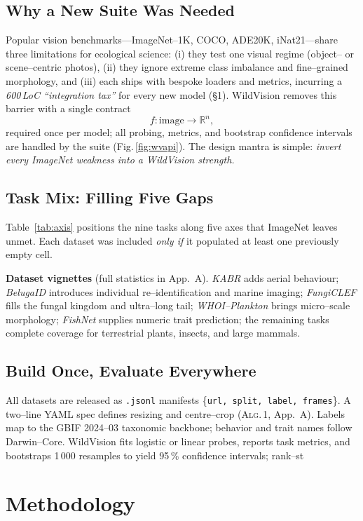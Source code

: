 \documentclass{article}
\begin{document}
\subsection{Why a New Suite Was Needed}
Popular vision benchmarks---ImageNet--1K, COCO, ADE20K, iNat21---share three
limitations for ecological science: (i) they test one visual regime
(object-- or scene--centric photos), (ii) they ignore extreme class
imbalance and fine–grained morphology, and (iii) each ships with bespoke
loaders and metrics, incurring a \emph{600\,LoC “integration tax”} for every
new model (§1).  
WildVision removes this barrier with a single contract  
\[
  \boxed{f:\text{image}\rightarrow\mathbb{R}^{n}},
\]
required once per model; all probing, metrics, and
bootstrap confidence intervals are handled by the suite (Fig.\,\ref{fig:wvapi}).
The design mantra is simple: \emph{invert every ImageNet weakness into a
WildVision strength.}

\subsection{Task Mix: Filling Five Gaps}
Table~\ref{tab:axis} positions the nine tasks along five axes that ImageNet
leaves unmet.  Each dataset was included \emph{only if} it populated at least
one previously empty cell.


\noindent\textbf{Dataset vignettes} (full statistics in App.~A).  
\textit{KABR} adds aerial behaviour;  
\textit{BelugaID} introduces individual re–identification and marine imaging;  
\textit{FungiCLEF} fills the fungal kingdom and ultra–long tail;  
\textit{WHOI–Plankton} brings micro–scale morphology;  
\textit{FishNet} supplies numeric trait prediction;  
the remaining tasks complete coverage for terrestrial plants, insects,
and large mammals.

\subsection{Build Once, Evaluate Everywhere}
All datasets are released as \texttt{.jsonl} manifests
\{\texttt{url, split, label, frames}\}.  
A two–line YAML spec defines resizing and centre–crop
(\textsc{Alg.\,1}, App.~A).  
Labels map to the GBIF 2024--03 taxonomic backbone; behavior and trait names
follow Darwin--Core.  
WildVision fits logistic or linear probes, reports task metrics, and
bootstraps 1\,000 resamples to yield 95\,\% confidence
intervals; rank–st

\section{Methodology}
\end{document}
